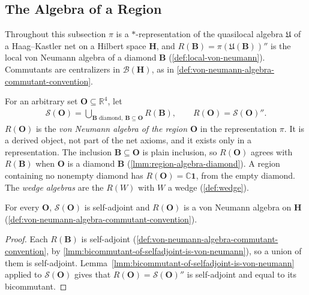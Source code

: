 \subsection{The Algebra of a Region}\label{sbsctn:region-algebra}

Throughout this subsection $\pi$ is a $*$-representation of the quasilocal algebra $\mathfrak{U}$ of a Haag--Kastler net on a Hilbert space $\mathbf{H}$, and $R(\mathbf{B}) = \pi(\mathfrak{U}(\mathbf{B}))''$ is the local von Neumann algebra of a diamond $\mathbf{B}$ (\ref{def:local-von-neumann}). Commutants are centralizers in $\mathcal{B}(\mathbf{H})$, as in \ref{def:von-neumann-algebra-commutant-convention}.

\begin{definition}
    \label{def:region-algebra}
    \leanok
    For an arbitrary set $\mathbf{O} \subseteq \mathbb{R}^4$, let
    \begin{align}
        \mathcal{S}(\mathbf{O}) = \bigcup_{\mathbf{B} \text{ diamond},\ \mathbf{B} \subseteq \mathbf{O}} R(\mathbf{B}), \qquad R(\mathbf{O}) = \mathcal{S}(\mathbf{O})''.
    \end{align}
    $R(\mathbf{O})$ is the \emph{von Neumann algebra of the region $\mathbf{O}$} in the representation $\pi$. It is a derived object, not part of the net axioms, and it exists only in a representation. The inclusion $\mathbf{B} \subseteq \mathbf{O}$ is plain inclusion, so $R(\mathbf{O})$ agrees with $R(\mathbf{B})$ when $\mathbf{O}$ is a diamond $\mathbf{B}$ (\ref{lmm:region-algebra-diamond}). A region containing no nonempty diamond has $R(\mathbf{O}) = \mathbb{C}\mathbf{1}$, from the empty diamond. The \emph{wedge algebras} are the $R(W)$ with $W$ a wedge (\ref{def:wedge}).
\end{definition}

\begin{lemma}
    \label{lmm:region-algebra-von-neumann}
    \leanok
    For every $\mathbf{O}$, $\mathcal{S}(\mathbf{O})$ is self-adjoint and $R(\mathbf{O})$ is a von Neumann algebra on $\mathbf{H}$ (\ref{def:von-neumann-algebra-commutant-convention}).
\end{lemma}
\begin{proof}
    \leanok
    Each $R(\mathbf{B})$ is self-adjoint (\ref{def:von-neumann-algebra-commutant-convention}, by \ref{lmm:bicommutant-of-selfadjoint-is-von-neumann}), so a union of them is self-adjoint. Lemma~\ref{lmm:bicommutant-of-selfadjoint-is-von-neumann} applied to $\mathcal{S}(\mathbf{O})$ gives that $R(\mathbf{O}) = \mathcal{S}(\mathbf{O})''$ is self-adjoint and equal to its bicommutant.
\end{proof}

